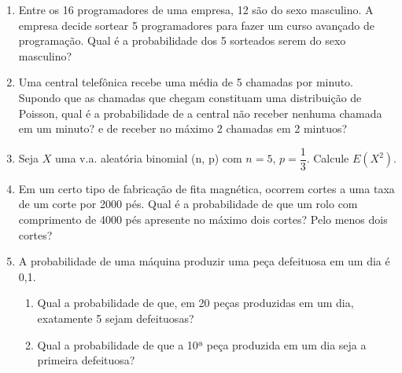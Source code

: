 \begin{enumerate}
	
\item Entre os 16 programadores de uma empresa, 12 são do sexo masculino. A empresa decide sortear 5 programadores para fazer um curso avançado de programação. Qual é a probabilidade dos 5 sorteados serem do sexo masculino?


\item Uma central telefônica recebe uma média de 5 chamadas por minuto. Supondo que as chamadas que chegam constituam uma distribuição de Poisson, qual é a probabilidade de a central não receber nenhuma chamada em um minuto? e de receber no máximo 2 chamadas em 2 mintuos?

\item Seja $X$ uma v.a. aleatória binomial (n, p) com $n = 5$, $p=\dfrac{1}{3}$. Calcule $E(X^{2})$.

\item Em um certo tipo de fabricação de fita magnética, ocorrem cortes a uma taxa de um corte por 2000 pés. Qual é a probabilidade de que um rolo com comprimento de 4000 pés apresente no máximo dois cortes? Pelo menos dois cortes?

\setcounter{enumi}{9}
\item A probabilidade de uma máquina produzir uma peça defeituosa em um dia é 0,1.

	\begin{enumerate}[label=\alph*)]
		\item Qual a probabilidade de que, em 20 peças produzidas em um dia, exatamente 5 sejam defeituosas?
		\item Qual a probabilidade de que a 10ª peça produzida em um dia seja a primeira defeituosa?
	\end{enumerate}


\end{enumerate}
